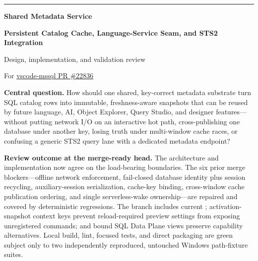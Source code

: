\documentclass[11pt]{article}
\newcommand{\code}[1]{\texttt{\detokenize{#1}}}
\begin{document}
\hypersetup{pageanchor=false}

\begin{titlepage}
\thispagestyle{empty}
\enlargethispage{0.35in}
\vspace*{0.30in}

{\color{violetdark}\rule{\textwidth}{2.2pt}}
\vspace{0.22in}

{\Huge\bfseries\color{ink} Shared Metadata Service\par}
\vspace{0.10in}
{\LARGE\bfseries\color{violetdark} Persistent Catalog Cache, Language-Service Seam, and STS2 Integration\par}
\vspace{0.12in}
{\Large\color{slate} Design, implementation, and validation review\par}

\vspace{0.24in}
{\large For \href{https://github.com/microsoft/vscode-mssql/pull/22836}{vscode-mssql PR \#22836}\par}

\vspace{0.24in}
\begin{tcolorbox}[enhanced,colback=lavender,colframe=violet,boxrule=1pt,arc=2mm,left=4mm,right=4mm,top=3mm,bottom=3mm]
\textbf{Central question.} How should one shared, key-correct metadata substrate turn SQL catalog rows into immutable, freshness-aware snapshots that can be reused by future language, AI, Object Explorer, Query Studio, and designer features---without putting network I/O on an interactive hot path, cross-publishing one database under another key, losing truth under multi-window cache races, or confusing a generic STS2 query lane with a dedicated metadata endpoint?
\end{tcolorbox}

\vspace{0.12in}
\begin{tcolorbox}[enhanced,colback=redbg,colframe=redish,boxrule=0.9pt,arc=2mm,left=4mm,right=4mm,top=2.5mm,bottom=2.5mm]
\textbf{Review outcome at the merge-ready head.} The architecture and implementation now agree on the load-bearing boundaries. The six prior merge blockers---offline network enforcement, fail-closed database identity plus session recycling, auxiliary-session serialization, cache-key binding, cross-window cache publication ordering, and single serverless-wake ownership---are repaired and covered by deterministic regressions. The branch includes current \code{main}; activation-snapshot context keys prevent reload-required preview settings from exposing unregistered commands; and bound SQL Data Plane views preserve capability alternatives. Local build, lint, focused tests, and direct packaging are green subject only to two independently reproduced, untouched Windows path-fixture suites.
\end{tcolorbox}


\end{titlepage}
\end{document}
